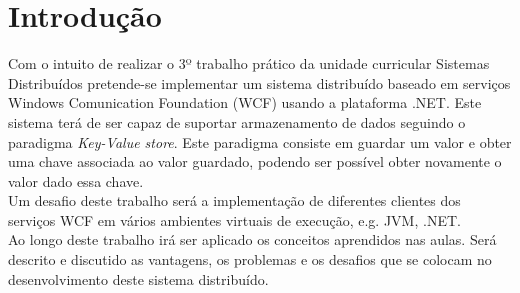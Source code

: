 \chapter{Introdução}
Com o intuito de realizar o 3º trabalho prático da unidade curricular Sistemas Distribuídos pretende-se implementar um sistema distribuído baseado em serviços Windows Comunication Foundation (WCF) usando a plataforma .NET. Este sistema terá de ser capaz de suportar armazenamento de dados seguindo o paradigma \textit{Key-Value store}. Este paradigma consiste em guardar um valor e obter uma chave associada ao valor guardado, podendo ser possível obter novamente o valor dado essa chave.\\
Um desafio deste trabalho será a implementação de diferentes clientes dos serviços WCF em vários ambientes virtuais de execução, e.g. JVM, .NET.\\
Ao longo deste trabalho irá ser aplicado os conceitos aprendidos nas aulas. Será descrito e discutido as vantagens, os problemas e os desafios que se colocam no desenvolvimento deste sistema distribuído.